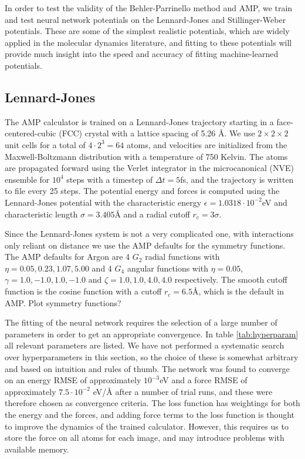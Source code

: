 In order to test the validity of the Behler-Parrinello method
and AMP, we train and test neural network potentials on the
Lennard-Jones and Stillinger-Weber potentials. These are some of
the simplest realistic potentials, which are widely applied
in the molecular dynamics literature, and fitting to these potentials
will provide much insight into the speed and accuracy of
fitting machine-learned potentials.

\subsection{Lennard-Jones}
The AMP calculator is trained on a Lennard-Jones trajectory
starting in a face-centered-cubic (FCC) crystal
with a lattice spacing of 5.26 Å. We use $2\times2\times2$ unit
cells for a total of $4\cdot2^3 = 64$ atoms, and velocities
are initialized from the Maxwell-Boltzmann distribution
with a temperature of 750 Kelvin.
The atoms are propagated forward using the Verlet integrator
in the microcanonical (NVE) ensemble for $10^4$ steps
with a timestep of $\Delta t = 5$fs, and the trajectory
is written to file every 25 steps.
The potential energy and forces is computed using the Lennard-Jones
potential with the characteristic energy $\epsilon = 1.0318\cdot
10^{-2}$eV and characteristic length $\sigma = 3.405$Å
and a radial cutoff $r_c = 3\sigma$.
\par
Since the Lennard-Jones system is not a very complicated one,
with interactions only reliant on distance we use the AMP
defaults for the symmetry functions.
The AMP defaults for Argon are 4 $G_2$ radial functions
with $\eta = 0.05, 0.23, 1.07, 5.00$ and 4 $G_4$ angular
functions with $\eta = 0.05$, $\gamma = 1.0, -1.0, 1.0, -1.0$
and $\zeta = 1.0, 1.0, 4.0, 4.0$ respectively.
The smooth cutoff function is the cosine function
with a cutoff $r_c = 6.5$Å, which is the default in AMP.
\newline Plot symmetry functions?
\par
The fitting of the neural network requires the selection
of a large number of parameters in order to get an appropriate
convergence. In table \ref{tab:hyperparam} all relevant parameters
are listed.
We have not performed a systematic search over
hyperparameters in this section, so the choice of these is somewhat
arbitrary and based on intuition and rules of thumb.
The network was found to converge on an energy RMSE of approximately
$10^{-3}$eV and a force RMSE of approximately $7.5\cdot10^{-2}$ eV/Å
after a number of trial runs, and these were therefore chosen
as convergence criteria.
The loss function has weightings for both the energy
and the forces, and adding force terms to the loss function
is thought to improve the dynamics of the trained calculator.
However, this requires us to store the force on all atoms
for each image, and may introduce problems with available memory.

